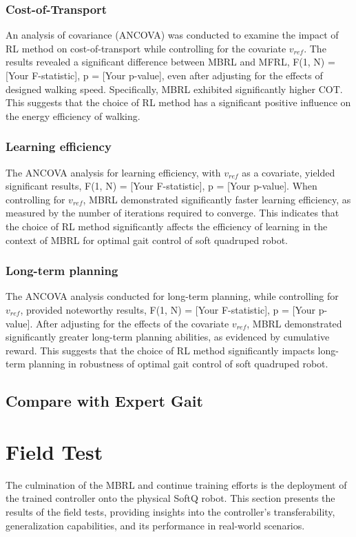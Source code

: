 \subsubsection{Cost-of-Transport}
An analysis of covariance (ANCOVA) was conducted to examine the impact of RL method on cost-of-transport while controlling for the covariate $v_{ref}$. The results revealed a significant difference between MBRL and MFRL, F(1, N) = [Your F-statistic], p = [Your p-value], even after adjusting for the effects of designed walking speed. Specifically, MBRL exhibited significantly higher \ac{COT}. This suggests that the choice of RL method has a significant positive influence on the energy efficiency of walking.
\subsubsection{Learning efficiency}
The ANCOVA analysis for learning efficiency, with $v_{ref}$ as a covariate, yielded significant results, F(1, N) = [Your F-statistic], p = [Your p-value]. When controlling for $v_{ref}$, MBRL demonstrated significantly faster learning efficiency, as measured by the number of iterations required to converge. This indicates that the choice of RL method significantly affects the efficiency of learning in the context of MBRL for optimal gait control of soft quadruped robot.
\subsubsection*{Long-term planning}
The ANCOVA analysis conducted for long-term planning, while controlling for $v_{ref}$, provided noteworthy results, F(1, N) = [Your F-statistic], p = [Your p-value]. After adjusting for the effects of the covariate $v_{ref}$, MBRL demonstrated significantly greater long-term planning abilities, as evidenced by cumulative reward. This suggests that the choice of RL method significantly impacts long-term planning in robustness of optimal gait control of soft quadruped robot. 



\subsection{Compare with Expert Gait}



\section{Field Test}
The culmination of the MBRL and continue training efforts is the deployment of the trained controller onto the physical SoftQ robot. This section presents the results of the field tests, providing insights into the controller's transferability, generalization capabilities, and its performance in real-world scenarios.

